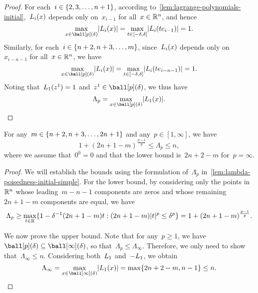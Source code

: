 \begin{proof}
    For each~$i \in \{2, 3, \dots, n + 1\}$, according to~\cref{lem:lagrange-polynomials-initial},~$\lagp[i](x)$ depends only on~$x_{i - 1}$ for all~$x \in \mathbb{R}^n$, and hence
    \begin{equation*}
        \max_{x \in \ball[p](\delta)} \abs{\lagp[i](x)} = \max_{t \in [-\delta, \delta]} \abs{\lagp[i](t e_{i - 1})} = 1.
    \end{equation*}
    Similarly, for each~$i \in \{n + 2, n + 3, \dots, m\}$, since~$\lagp[i](x)$ depends only on~$x_{i - n - 1}$ for all~$x \in \mathbb{R}^n$, we have
    \begin{equation*}
        \max_{x \in \ball[p](\delta)} \abs{\lagp[i](x)} = \max_{t \in [-\delta, \delta]} \abs{\lagp[i](t e_{i - n - 1})} = 1.
    \end{equation*}
    Noting that~$\lagp[1](z^1) = 1$ and~$z^1 \in \ball[p](\delta)$, we thus have
    \begin{equation*}
        \Lambda_p = \max_{x \in \ball[p](\delta)} \abs{\lagp[1](x)}.
    \end{equation*}
\end{proof}

\begin{theorem}
    \label{thm:lambda-poisedness-initial}
    For any~$m \in \{n + 2, n + 3, \dots, 2n + 1\}$ and any~$p \in [1, \infty]$, we have
    \begin{equation*}
        1 + (2n + 1 - m)^{\frac{p - 1}{p}} \le \Lambda_p \le n,
    \end{equation*}
    where we assume that~$0^0 = 0$ and that the lower bound is~$2n + 2 - m$ for~$p = \infty$.
\end{theorem}

\begin{proof}
    We will establish the bounds using the formulation of~$\Lambda_p$ in~\cref{lem:lambda-poisedness-initial-simple}.
    For the lower bound, by considering only the points in~$\mathbb{R}^n$ whose leading~$m - n - 1$ components are zeros and whose remaining~$2n + 1 - m$ components are equal, we have
    \begin{equation*}
        \Lambda_p \ge \max_{t \in \mathbb{R}} \{1 - \delta^{-1} (2n + 1 - m) t : (2n + 1 - m) \lvert t\rvert^p \le \delta^p\} = 1 + (2n + 1 - m)^{\frac{p - 1}{p}}.
    \end{equation*}
    
    We now prove the upper bound.
    Note that for any~$p \ge 1$, we have~$\ball[p](\delta) \subseteq \ball[\infty](\delta)$, so that~$\Lambda_p \le \Lambda_{\infty}$.
    Therefore, we only need to show that~$\Lambda_{\infty} \le n$.
    Considering both~$\lagp[1]$ and~$-\lagp[1]$, we obtain
    \begin{equation*}
        \Lambda_{\infty} = \max_{x \in \ball[\infty](\delta)} \abs{\lagp[1](x)} = \max \set{2n + 2 - m, n - 1} \le n.
    \end{equation*}
\end{proof}

